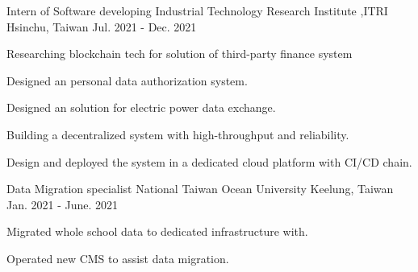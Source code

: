 

\begin{cventries}

  \cventry
    {Intern of Software developing} %
    {Industrial Technology Research Institute ,ITRI} %
    {Hsinchu, Taiwan} %
    {Jul. 2021 - Dec. 2021} %
    {
      \begin{cvitems} %
        \item {Researching blockchain tech for solution of third-party finance system}
        \item {Designed an personal data authorization system.}
        \item {Designed an solution for electric power data exchange.}
        \item {Building a decentralized system with high-throughput and reliability.}
        \item {Design and deployed the system in a dedicated cloud platform with CI/CD chain.}
      \end{cvitems}
    }

  \cventry
    {Data Migration specialist} %
    {National Taiwan Ocean University} %
    {Keelung, Taiwan} %
    {Jan. 2021 - June. 2021} %
    {
      \begin{cvitems} %
        \item {Migrated whole school data to dedicated infrastructure with.}
        \item {Operated new CMS to assist data migration.}
      \end{cvitems}
    }
\end{cventries}
